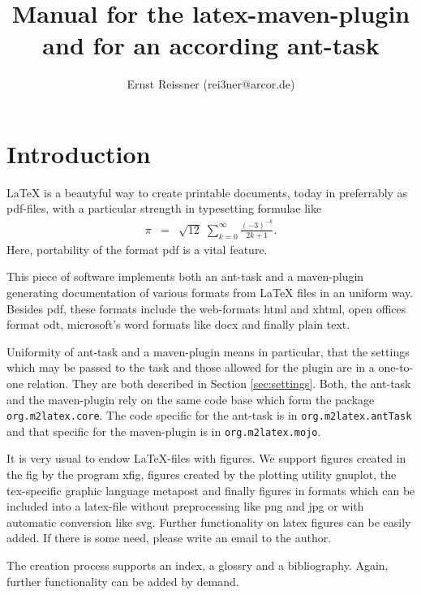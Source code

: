 \documentclass[12pt]{article}
\title{Manual for the latex-maven-plugin and for an according ant-task }
\author{Ernst Reissner (rei3ner@arcor.de)}
\begin{document}
\maketitle

\tableofcontents
\listoffigures
\listoftables


\section{Introduction}

LaTeX is a beautyful way to create printable documents, 
today in preferrably as \gls{pdf}-files, 
with a particular strength in typesetting formulae like 
%
\begin{eqnarray*}
\pi & = & \sqrt{12}\;\sum^\infty_{k=0} \frac{(-3)^{-k}}{2k+1}. 
\end{eqnarray*}
%
Here, portability of the format \gls{pdf} is a vital feature. 

This piece of software implements both an ant-task and a maven-plugin 
generating documentation of various formats from LaTeX files 
in an uniform way. 
Besides \gls{pdf}, these formats include the web-formats \gls{html} 
and \gls{xhtml}, 
open offices format \gls{odt}, microsoft's word formats like \gls{docx} 
and finally plain text. 

Uniformity of ant-task and a maven-plugin means in particular, 
that the settings which may be passed to the task 
and those allowed for the plugin are in a one-to-one relation. 
They are both described in Section \ref{sec:settings}. 
Both, the ant-task and the maven-plugin rely on the same code base 
which form the package {\tt org.m2latex.core}. 
The code specific for the ant-task is in {\tt org.m2latex.antTask} 
and that specific for the maven-plugin is in {\tt org.m2latex.mojo}. 

It is very usual to endow LaTeX-files with figures. 
We support figures created in the \gls{fig} by the program xfig, 
figures created by the plotting utility gnuplot, 
the tex-specific graphic language metapost 
and finally figures in formats which can be included into a latex-file 
without preprocessing like \gls{png} and \gls{jpg} 
or with automatic conversion like \gls{svg}. 
Further functionality on latex figures can be easily added. 
If there is some need, please write an email to the author. 

The creation process supports an index, a glossry and a bibliography. 
Again, further functionality can be added by demand. 
\end{document}
